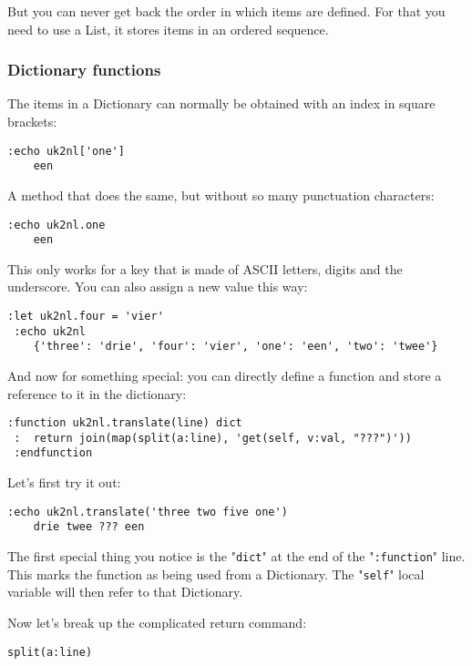 But you can never get back the order in which items are defined.
For that you need to use a List, it stores items in an ordered sequence.
\subsubsection{Dictionary functions}
The items in a Dictionary can normally be obtained with an index in square brackets:

\begin{Verbatim}[samepage=true]
 :echo uk2nl['one']
    een
\end{Verbatim}

A method that does the same, but without so many punctuation characters:

\begin{Verbatim}[samepage=true]
 :echo uk2nl.one
    een
\end{Verbatim}

This only works for a key that is made of ASCII letters, digits and the underscore.
You can also assign a new value this way:

\begin{Verbatim}[samepage=true]
 :let uk2nl.four = 'vier'
 :echo uk2nl
    {'three': 'drie', 'four': 'vier', 'one': 'een', 'two': 'twee'}
\end{Verbatim}

And now for something special: you can directly define a function and store a reference to it in the dictionary:

\begin{Verbatim}[samepage=true]
 :function uk2nl.translate(line) dict
 :  return join(map(split(a:line), 'get(self, v:val, "???")'))
 :endfunction
\end{Verbatim}

Let's first try it out:

\begin{Verbatim}[samepage=true]
 :echo uk2nl.translate('three two five one')
    drie twee ??? een
\end{Verbatim}

The first special thing you notice is the "\verb!dict!" at the end of the "\verb!:function!" line.
This marks the function as being used from a Dictionary.
The "\verb!self!" local variable will then refer to that Dictionary.

Now let's break up the complicated return command:

\begin{Verbatim}[samepage=true]
 split(a:line)
\end{Verbatim}


